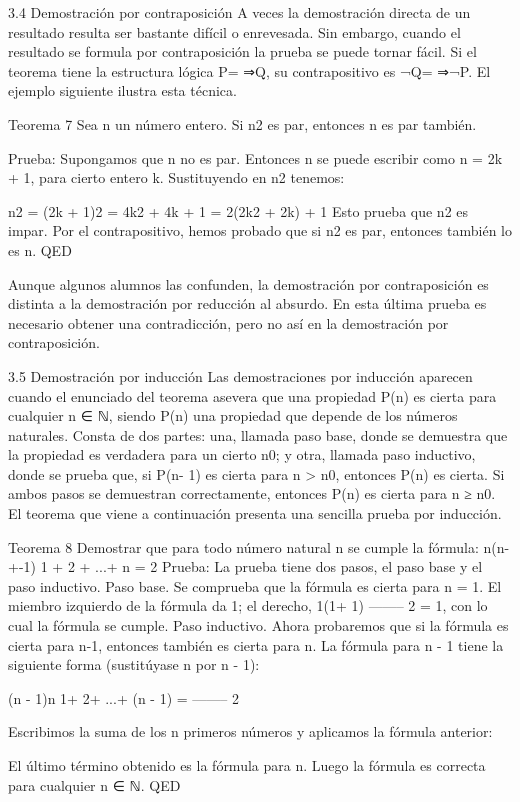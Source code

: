 3.4 Demostración por contraposición
A veces la demostración directa de un resultado resulta ser bastante difícil o enrevesada. Sin embargo, cuando el resultado se formula por contraposición la prueba se puede tornar fácil. Si el teorema tiene la estructura lógica P= ⇒Q, su contrapositivo es ¬Q= ⇒¬P. El ejemplo siguiente ilustra esta técnica.

Teorema 7 Sea n un número entero. Si n2 es par, entonces n es par también.

Prueba: Supongamos que n no es par. Entonces n se puede escribir como n = 2k + 1, para cierto entero k. Sustituyendo en n2 tenemos:

n2 = (2k + 1)2 = 4k2 + 4k + 1 = 2(2k2 + 2k) + 1
Esto prueba que n2 es impar. Por el contrapositivo, hemos probado que si n2 es par, entonces también lo es n. QED

Aunque algunos alumnos las confunden, la demostración por contraposición es distinta a la demostración por reducción al absurdo. En esta última prueba es necesario obtener una contradicción, pero no así en la demostración por contraposición.


3.5 Demostración por inducción
Las demostraciones por inducción aparecen cuando el enunciado del teorema asevera que una propiedad P(n) es cierta para cualquier n ∈ ℕ, siendo P(n) una propiedad que depende de los números naturales. Consta de dos partes: una, llamada paso base, donde se demuestra que la propiedad es verdadera para un cierto n0; y otra, llamada paso inductivo, donde se prueba que, si P(n- 1) es cierta para n > n0, entonces P(n) es cierta. Si ambos pasos se demuestran correctamente, entonces P(n) es cierta para n ≥ n0. El teorema que viene a continuación presenta una sencilla prueba por inducción.

Teorema 8 Demostrar que para todo número natural n se cumple la fórmula:
n(n-+-1)
1 + 2 + ...+  n =    2
Prueba: La prueba tiene dos pasos, el paso base y el paso inductivo.
Paso base. Se comprueba que la fórmula es cierta para n = 1. El miembro izquierdo de la fórmula da 1; el derecho, 1(1+ 1)
--------
2 = 1, con lo cual la fórmula se cumple.
Paso inductivo. Ahora probaremos que si la fórmula es cierta para n-1, entonces también es cierta para n. La fórmula para n - 1 tiene la siguiente forma (sustitúyase n por n - 1):

(n - 1)n
1+  2+ ...+ (n - 1) = --------
2

Escribimos la suma de los n primeros números y aplicamos la fórmula anterior:


El último término obtenido es la fórmula para n. Luego la fórmula es correcta para cualquier n ∈ ℕ. QED



